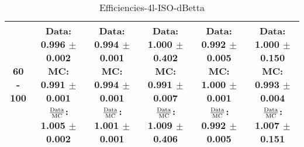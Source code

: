\documentclass[final,letterpaper,twoside,12pt]{article}
\begin{document}
\begin{table}[htbp]
\begin{adjustwidth}{-4em}{-4em}
\begin{tabular}{|c|c|c|c|c|c|}
60 - 100 & \parbox[c]{1.1 in}{ \scriptsize  Data: 0.996 $\pm$ 0.002 \newline MC: 0.991 $\pm$ 0.001 \newline $\frac{\rm{Data}}{\rm{MC}}$: 1.005 $\pm$ 0.002} & \parbox[c]{1.1 in}{ \scriptsize  Data: 0.994 $\pm$ 0.001 \newline MC: 0.994 $\pm$ 0.001 \newline $\frac{\rm{Data}}{\rm{MC}}$: 1.001 $\pm$ 0.001} & \parbox[c]{1.1 in}{ \scriptsize  Data: 1.000 $\pm$ 0.402 \newline MC: 0.991 $\pm$ 0.007 \newline $\frac{\rm{Data}}{\rm{MC}}$: 1.009 $\pm$ 0.406} & \parbox[c]{1.1 in}{ \scriptsize  Data: 0.992 $\pm$ 0.005 \newline MC: 1.000 $\pm$ 0.001 \newline $\frac{\rm{Data}}{\rm{MC}}$: 0.992 $\pm$ 0.005} & \parbox[c]{1.1 in}{ \scriptsize  Data: 1.000 $\pm$ 0.150 \newline MC: 0.993 $\pm$ 0.004 \newline $\frac{\rm{Data}}{\rm{MC}}$: 1.007 $\pm$ 0.151}\\ \hline 
\end{tabular}
\caption {Efficiencies-4l-ISO-dBetta}
\label{tab:cqdata0}
\end{adjustwidth}\end{table}
\end{document}
